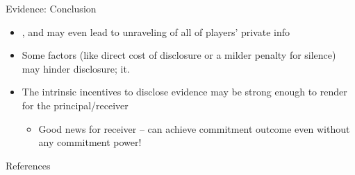\documentclass[english,10pt
,aspectratio=169
]{beamer}
\begin{document}
\begin{frame}{Evidence: Conclusion}
\begin{itemize}
	\item {}, and may even lead to unraveling of all of players' private info
	\item Some factors (like direct cost of disclosure or a milder penalty for silence) may \alert{hinder disclosure};  it.
	\item The intrinsic incentives to disclose evidence may be strong enough to render  for the principal/receiver
	\begin{itemize}
		\item Good news for receiver -- can achieve commitment outcome even without any commitment power!
	\end{itemize}
\end{itemize}
\end{frame}


\appendix
\begin{frame}[allowframebreaks]{References}


\end{frame}
\end{document}
